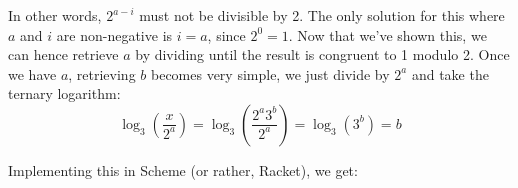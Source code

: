 \documentclass{../../sicp}
\begin{document}
In other words, $2^{a-i}$ must not be divisible by 2.
The only solution for this where $a$ and $i$ are non-negative is $i = a$, since $2^0 = 1$.
Now that we've shown this, we can hence retrieve $a$ by dividing until the result is congruent to 1 modulo 2.
Once we have $a$, retrieving $b$ becomes very simple, we just divide by $2^a$ and take the ternary logarithm:
\[
	\log_3\left(\frac{x}{2^a}\right) = \log_3\left(\frac{2^a 3^b}{2^a}\right) = \log_3(3^b) = b
\]

Implementing this in Scheme (or rather, Racket), we get:


\end{document}
